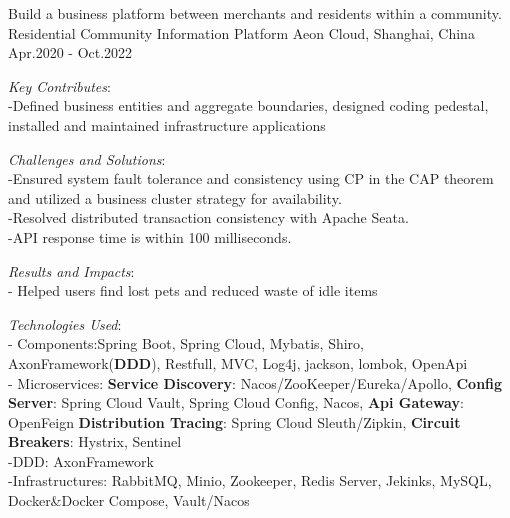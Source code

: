 

\begin{cventries}
  \cventry
    {Build a business platform between merchants and residents within a community.} %
    {Residential Community Information  Platform} %
    {Aeon Cloud, Shanghai, China} %
    {Apr.2020 - Oct.2022} %
    {
      \begin{cvitems} %
        \item { \textit{Key Contributes}:\\-Defined business entities and aggregate boundaries, designed coding pedestal, installed and maintained infrastructure applications  }
        \item { \textit{Challenges and Solutions}: \\-Ensured system fault tolerance and consistency using CP in the CAP theorem and utilized a business cluster strategy for availability. \\-Resolved distributed transaction consistency with Apache Seata. \\-API response time is within 100 milliseconds.}
        \item {\textit{Results and Impacts}: \\- Helped users find lost pets and reduced waste of idle items  }
        \item {\textit{Technologies Used}: \\- Components:Spring Boot, Spring Cloud, Mybatis, Shiro, AxonFramework(\textbf{DDD}), Restfull, MVC, Log4j, jackson, lombok, OpenApi \\- {Microservices: \textbf{Service Discovery}: { Nacos/ZooKeeper/Eureka/Apollo,} \textbf{Config Server}: Spring Cloud Vault, Spring Cloud Config, Nacos,  \textbf{Api Gateway}: OpenFeign  \textbf{Distribution Tracing}: Spring Cloud Sleuth/Zipkin, \textbf{Circuit Breakers}: Hystrix, Sentinel} \\-DDD: AxonFramework  \\-Infrastructures: RabbitMQ, Minio, Zookeeper, Redis Server, Jekinks, MySQL, Docker\&Docker Compose, Vault/Nacos }
      \end{cvitems}
    }


\end{cventries}
